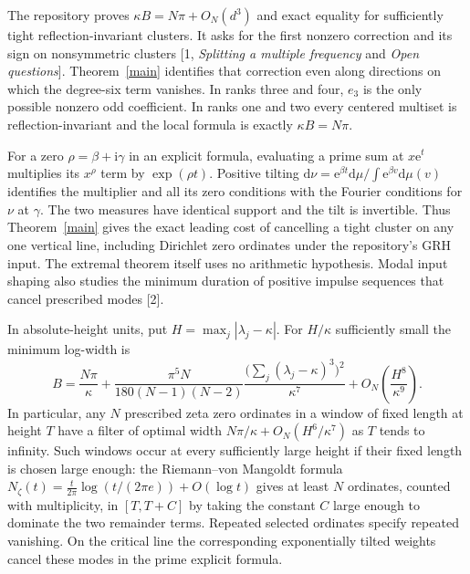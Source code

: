 \documentclass[11pt]{article}
\newcommand{\dd}{\mathrm d}
\newcommand{\ii}{\mathrm i}
\newcommand{\e}{\mathrm e}
\begin{document}
The repository proves $\kappa B=N\pi+O_N(d^3)$ and exact equality for
sufficiently tight reflection-invariant clusters. It asks for the first
nonzero correction and its sign on nonsymmetric clusters [1,
\emph{Splitting a multiple frequency} and \emph{Open questions}].
Theorem~\ref{main} identifies that correction even along directions on which
the degree-six term vanishes. In ranks three and four, $e_3$ is the only
possible nonzero odd coefficient. In ranks one and two every centered multiset
is reflection-invariant and the local formula is exactly $\kappa B=N\pi$.

For a zero $\rho=\beta+\ii\gamma$ in an explicit formula, evaluating a prime
sum at $x\e^t$ multiplies its $x^\rho$ term by $\exp(\rho t)$.
Positive tilting $\dd\nu=\e^{\beta t}\dd\mu/\int\e^{\beta v}\dd\mu(v)$ identifies
the multiplier and all its zero conditions with the Fourier conditions for
$\nu$ at $\gamma$. The two measures have identical support and the tilt is
invertible. Thus Theorem~\ref{main} gives the exact leading cost of cancelling
a tight cluster on any one vertical line, including Dirichlet zero ordinates
under the repository's GRH input. The extremal theorem itself uses no
arithmetic hypothesis. Modal input shaping also studies the minimum duration
of positive impulse sequences that cancel prescribed modes [2].


In absolute-height units, put $H=\max_j|\lambda_j-\kappa|$. For $H/\kappa$
sufficiently small the minimum log-width is
\[
 B=\frac{N\pi}{\kappa}
   +\frac{\pi^5N}{180(N-1)(N-2)}
       \frac{\bigl(\sum_j(\lambda_j-\kappa)^3\bigr)^2}{\kappa^7}
   +O_N\!\left(\frac{H^8}{\kappa^9}\right).
\]
In particular, any $N$ prescribed zeta zero ordinates in a window of fixed
length at height $T$ have a filter of optimal width
$N\pi/\kappa+O_N(H^6/\kappa^7)$ as $T$ tends to infinity. Such windows
occur at every sufficiently large height if their fixed length is chosen
large enough: the Riemann--von Mangoldt formula
$N_\zeta(t)=\tfrac{t}{2\pi}\log(t/(2\pi e))+O(\log t)$
gives at least $N$ ordinates, counted with multiplicity, in $[T,T+C]$
by taking the constant $C$ large enough to dominate the two remainder
terms. Repeated selected ordinates specify repeated vanishing. On the
critical line the corresponding exponentially tilted weights cancel
these modes in the prime explicit formula.
\end{document}
